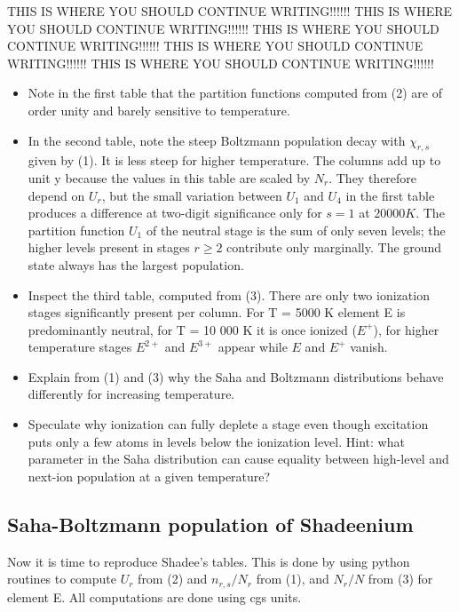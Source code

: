 \documentclass{aa}   %
\begin{document}
THIS IS WHERE YOU SHOULD CONTINUE WRITING!!!!!!
THIS IS WHERE YOU SHOULD CONTINUE WRITING!!!!!!
THIS IS WHERE YOU SHOULD CONTINUE WRITING!!!!!!
THIS IS WHERE YOU SHOULD CONTINUE WRITING!!!!!!
THIS IS WHERE YOU SHOULD CONTINUE WRITING!!!!!!





\begin{itemize}
 \item 
 Note in the first table that the partition functions computed from (2) are of order unity and barely sensitive to temperature.
\item
In the second table, note the steep Boltzmann population decay with $\chi_{r,s}$ given by (1). It is less steep for higher temperature. The columns add up to unit y because the values in this table are scaled by $N_r$. They therefore depend on $U_r$, but the small variation between $U_1$ and $U_4$ in the first table produces a difference at two-digit significance only for $s = 1$ at $20 000 K$. The partition function $U_1$ of the neutral stage is the sum of only seven levels; the higher levels present in stages $r \ge 2$ contribute only marginally. The ground state always has the largest population.
\item
Inspect the third table, computed from (3). There are only two ionization stages significantly present per column. For T = 5000 K element E is predominantly neutral, for T = 10 000 K it is once ionized ($E^+$), for higher temperature stages $E^{2+}$ and $E^{3+}$ appear while $E$ and $E^+$ vanish.
\item
Explain from (1) and (3) why the Saha and Boltzmann distributions behave differently for increasing temperature.
\item
Speculate why ionization can fully deplete a stage even though excitation puts only a few atoms in levels below the ionization level. Hint: what parameter in the Saha distribution can cause equality between high-level and next-ion population at a given temperature?
\end{itemize}
\subsection{Saha-Boltzmann population of Shadeenium}
Now it is time to reproduce Shadee's tables. This is done by using python routines to compute $U_r$ from (2) and $n_{r,s}/N_r$ from (1), and $N_r/N$ from (3) for element E. All computations are done using cgs units.
\end{document}
